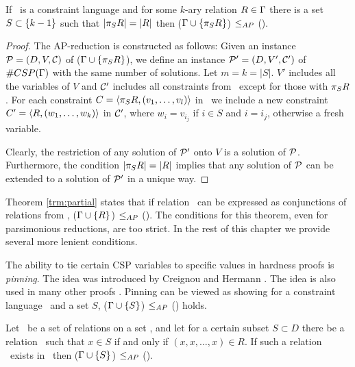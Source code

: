 \begin{lemma}\label{lem:projection}
If \mrelset\ is a constraint language and for some \(k\)-ary relation \(R\in\Gamma\)
there is a set \(S\subset \{{k-1}\}\) such that \(|\pi_{S}{R}|=|R|\) then 
\ccsp(\(\Gamma \cup \{{\pi_{S}{R}}\}\)) \(\le_{AP}\) \ccsp(\mrelset)\@.
\end{lemma}

\begin{proof}
The AP-reduction is constructed as follows: Given an instance \(\mathcal{P}=(D,V,\mathcal{C})\)
of \ccsp(\(\Gamma\cup \{\pi_{S}{R}\}\)), we define an 
instance \(\mathcal{P}'=(D,V',\mathcal{C}')\) of \(\#CSP(\Gamma)\) with the same number of solutions.
Let \(m=k=|S|\)\@. \(V'\) includes all the variables of \(V\) and
\(\mathcal{C}'\) includes all constraints from \mconset\ except for those with \(\pi_{S}{R}\). For each
constraint \(C=\langle \pi_{S}{R},(v_1,\dotsc,v_l) \rangle\) in \mconset\ 
we include a new constraint \(C'=\langle R,(w_1,\dotsc,w_k) \rangle\) in \(\mathcal{C}'\), where 
\(w_i=v_{i_j}\) if \(i\in S\) and \(i=i_j\), otherwise a fresh variable.

Clearly, the restriction of any solution of \(\mathcal{P}'\) onto \(V\) is a solution of \(\mathcal{P}\)\@.
Furthermore, the condition \(|\pi_{S}{R}|=|R|\) implies that any solution of \(\mathcal{P}\)
can be extended to a solution of \(\mathcal{P}'\) in a unique way.
\end{proof}


Theorem \ref{trm:partial} states that if relation \mR\ can be expressed as conjunctions 
of relations from \mrelset, \ccsp(\(\Gamma \cup \{{R}\}\)) \(\le_{AP}\) \ccsp(\mrelset)\@.
The conditions for this theorem, even for parsimonious reductions, are too strict. 
In the rest of this chapter we provide several more lenient conditions.

The ability to tie certain CSP variables to specific values in hardness proofs is 
\emph{pinning}\@. The idea was introduced by Creignou and Hermann \cite{Nadia}. The idea
is also used in many other proofs \cite{bulatov07,Dyer,Trichotomy,madu}. Pinning can be
viewed as showing for a constraint language \mrelset\ and a set \(S\), 
\ccsp(\(\Gamma \cup \{{S}\}\)) \(\le_{AP}\) \ccsp(\mrelset) holds.

\begin{lemma} [Pinning and reflexive elements] \label{lem:refpin}
Let \mrelset\ be a set of relations on a set \mD, and let for a certain subset \(S \subset D\)
there be a relation \mR\ such that \(x\in S\) if and only if 
\((x,x,\dotsc,x)\in R\)\@. If such a relation \mR\ exists in \mrelset\ then
\ccsp(\(\Gamma \cup \{{S}\}\)) \(\le_{AP}\) \ccsp(\mrelset)\@.
\end{lemma}

